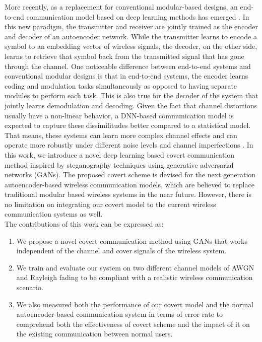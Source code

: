 More recently, as a replacement for conventional modular-based designs, an end-to-end communication model based on deep learning methods has emerged \cite{o2017introduction}. In this new paradigm, the transmitter and receiver are jointly trained as the encoder and decoder of an autoencoder network. While the transmitter learns to encode a symbol to an embedding vector of wireless signals, the decoder, on the other side, learns to retrieve that symbol back from the transmitted signal that has gone through the channel. One noticeable difference between end-to-end systems and conventional modular designs is that in end-to-end systems, the encoder learns coding and modulation tasks simultaneously as opposed to having separate modules to perform each task. This is also true for the decoder of the system that jointly learns demodulation and decoding. Given the fact that channel distortions usually have a non-linear behavior, a DNN-based communication model is expected to capture these dissimilitudes better compared to a statistical model. That means, these systems can learn more complex channel effects and can operate more robustly under different noise levels and channel imperfections \cite{wang2017deep}.
In this work, we introduce a novel deep learning based covert communication method inspired by steganography techniques using generative adversarial networks (GANs). The proposed covert scheme is devised for the next generation autoencoder-based wireless communication models, which are believed to replace traditional modular based wireless systems in the near future. However, there is no limitation on integrating our covert model to the current wireless communication systems as well.\\
The contributions of this work can be expressed as:
\begin{enumerate}
	\item We propose a novel covert communication method using GANs that works independent of the channel and cover signals of the wireless system.
	\item We train and evaluate our system on two different channel models of AWGN and Rayleigh fading to be compliant with a realistic wireless communication scenario.
	\item We also measured both the performance of our covert model and the normal autoencoder-based communication system in terms of error rate to comprehend both the effectiveness of covert scheme and the impact of it on the existing communication between normal users.
\end{enumerate}
